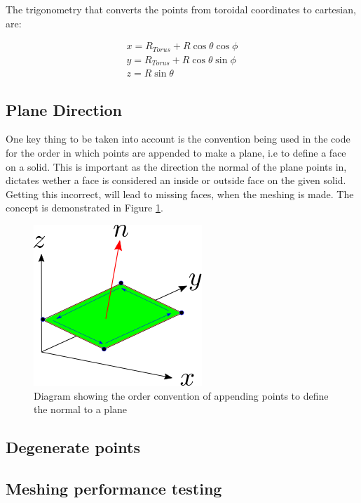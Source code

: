 \documentclass[12pt,a4paper]{article}
\begin{document}
The trigonometry that converts the points from toroidal coordinates to cartesian, are:

\begin{equation}
\begin{split}
x = R_{Torus} + R\cos{\theta}\cos{\phi} \\
y = R_{Torus} + R\cos{\theta}\sin{\phi} \\
z =  R\sin{\theta}
\end{split}
\end{equation}

\subsection{Plane Direction}
One key thing to be taken into account is the convention being used in the code for the order in which points are appended to make a plane, i.e to define a face on a solid. This is important as the direction the normal of the plane points in, dictates wether a face is considered an inside or outside face on the given solid. Getting this incorrect, will lead to missing faces, when the meshing is made. The concept is demonstrated in Figure \ref{pointsorder}.

\begin{figure}[h!]
\centering
\includegraphics[scale=0.75]{Images//append_points//Point_Appending_Order.png}
\caption[width=\columnwidth]{Diagram showing the order convention of appending points to define the normal to a plane}
\label{pointsorder}
\end{figure}

\subsection{Degenerate points}


\subsection{Meshing performance testing}
\end{document}
